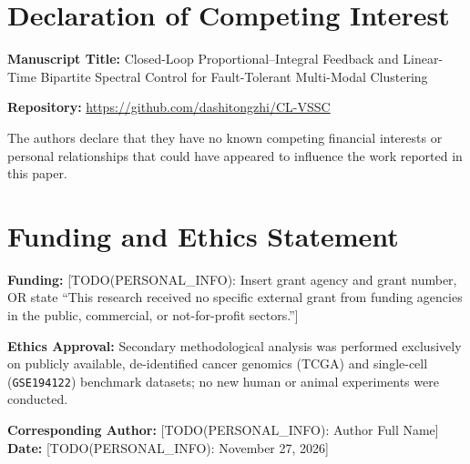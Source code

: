 \documentclass[11pt,letterpaper]{article}
\begin{document}
\section*{Declaration of Competing Interest}

\textbf{Manuscript Title:} Closed-Loop Proportional--Integral Feedback and Linear-Time Bipartite Spectral Control for Fault-Tolerant Multi-Modal Clustering

\textbf{Repository:} \url{https://github.com/dashitongzhi/CL-VSSC}

The authors declare that they have no known competing financial interests or personal relationships that could have appeared to influence the work reported in this paper.

\section*{Funding and Ethics Statement}

\textbf{Funding:} [TODO(PERSONAL\_INFO): Insert grant agency and grant number, OR state ``This research received no specific external grant from funding agencies in the public, commercial, or not-for-profit sectors.'']

\textbf{Ethics Approval:} Secondary methodological analysis was performed exclusively on publicly available, de-identified cancer genomics (TCGA) and single-cell (\texttt{GSE194122}) benchmark datasets; no new human or animal experiments were conducted.

\vspace{16pt}
\textbf{Corresponding Author:} [TODO(PERSONAL\_INFO): Author Full Name]\\
\textbf{Date:} [TODO(PERSONAL\_INFO): November 27, 2026]
\end{document}
